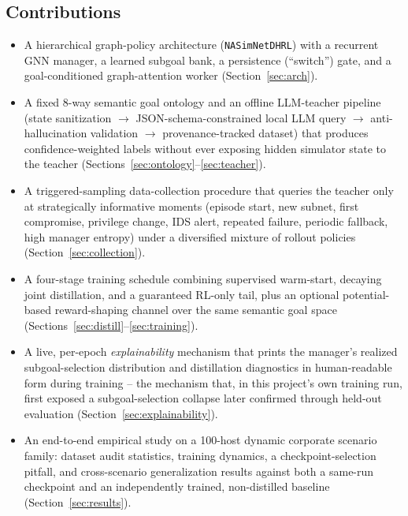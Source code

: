 \documentclass[11pt]{article}
\newcommand{\code}[1]{\texttt{#1}}
\begin{document}
\subsection{Contributions}
\begin{itemize}[leftmargin=1.4em]
  \item A hierarchical graph-policy architecture (\code{NASimNetDHRL}) with a
        recurrent GNN manager, a learned subgoal bank, a persistence (``switch'')
        gate, and a goal-conditioned graph-attention worker (Section~\ref{sec:arch}).
  \item A fixed 8-way semantic goal ontology and an offline LLM-teacher pipeline
        (state sanitization $\to$ JSON-schema-constrained local LLM query $\to$
        anti-hallucination validation $\to$ provenance-tracked dataset) that produces
        confidence-weighted labels without ever exposing hidden simulator state to
        the teacher (Sections~\ref{sec:ontology}--\ref{sec:teacher}).
  \item A triggered-sampling data-collection procedure that queries the teacher only
        at strategically informative moments (episode start, new subnet, first
        compromise, privilege change, IDS alert, repeated failure, periodic fallback,
        high manager entropy) under a diversified mixture of rollout policies
        (Section~\ref{sec:collection}).
  \item A four-stage training schedule combining supervised warm-start, decaying
        joint distillation, and a guaranteed RL-only tail, plus an optional
        potential-based reward-shaping channel over the same semantic goal space
        (Sections~\ref{sec:distill}--\ref{sec:training}).
  \item A live, per-epoch \emph{explainability} mechanism that prints the manager's
        realized subgoal-selection distribution and distillation diagnostics in
        human-readable form during training -- the mechanism that, in this project's
        own training run, first exposed a subgoal-selection collapse later confirmed
        through held-out evaluation (Section~\ref{sec:explainability}).
  \item An end-to-end empirical study on a 100-host dynamic corporate scenario family:
        dataset audit statistics, training dynamics, a checkpoint-selection pitfall,
        and cross-scenario generalization results against both a same-run checkpoint
        and an independently trained, non-distilled baseline (Section~\ref{sec:results}).
\end{itemize}
\end{document}
